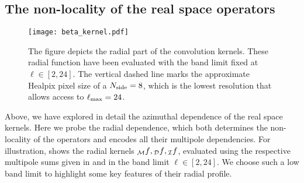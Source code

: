 \subsection{The non-locality of the real space operators} \label{sec:radial_locality}
%
\begin{figure}[t]
\centering
\texttt{[image: beta\_kernel.pdf]}
\caption{The figure depicts the radial part of the convolution kernels. These radial function have been evaluated with the band limit fixed at $\ell \in [2,24]$. The vertical dashed line marks the approximate Healpix pixel size of a $N_{\rm side}=8$, which is the lowest resolution that allows access to $\ell_{\rm max}=24$.}
\label{fig:beta_kernel}
\end{figure}
%
Above, we have explored in detail the  azimuthal dependence of the real space kernels.  Here we probe the radial dependence, which both  determines the non-locality of the operators and encodes all their multipole dependencies. For illustration,  shows the radial kernels ${_{\mathcal{M}}f}, {_{\mathcal{D}}f},{_{\mathcal{I}}f}$, evaluated using the respective multipole sums given in  and  in the band limit $\ell \in [2,24]$. We choose such a low band limit to highlight some key features of their radial profile.
%
